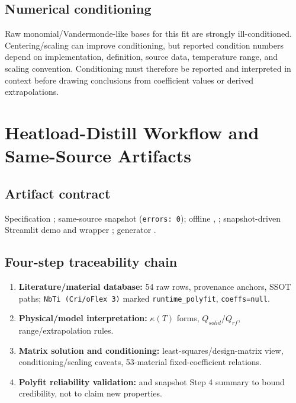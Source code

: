 \documentclass[11pt,a4paper]{article}
\begin{document}
\subsection{Numerical conditioning}
Raw monomial/Vandermonde-like bases for this fit are strongly ill-conditioned. Centering/scaling can improve conditioning, but reported condition numbers depend on implementation, definition, source data, temperature range, and scaling convention. Conditioning must therefore be reported and interpreted in context before drawing conclusions from coefficient values or derived extrapolations.

\section{Heatload-Distill Workflow and Same-Source Artifacts}
\subsection{Artifact contract}
Specification ; same-source snapshot  (\texttt{errors: 0}); offline , ; snapshot-driven Streamlit demo  and wrapper ; generator .

\subsection{Four-step traceability chain}
\begin{enumerate}[leftmargin=*]
\item \textbf{Literature/material database:} 54 raw rows, provenance anchors, SSOT paths; \texttt{NbTi (Cri/oFlex 3)} marked \texttt{runtime\_polyfit}, \texttt{coeffs=null}.
\item \textbf{Physical/model interpretation:} $\kappa(T)$ forms, $Q_{solid}/Q_{rf}$, range/extrapolation rules.
\item \textbf{Matrix solution and conditioning:} least-squares/design-matrix view, conditioning/scaling caveats, 53-material fixed-coefficient relations.
\item \textbf{Polyfit reliability validation:}  and snapshot Step 4 summary to bound credibility, not to claim new properties.
\end{enumerate}
\end{document}
